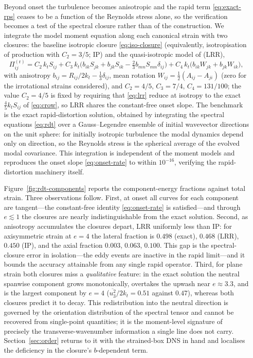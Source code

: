 \documentclass[lineno]{JFM-FLM_Au}
\begin{document}
Beyond onset the turbulence becomes anisotropic and the rapid term
\eqref{eq:exact-rps} ceases to be a function of the Reynolds stress
alone, so the verification becomes a test of the spectral closure rather
than of the construction. We integrate the model moment equation along
each canonical strain with two closures: the baseline isotropic closure
\eqref{eq:iso-closure} (equivalently, isotropisation of production with
$C_2=3/5$; IP) and the quasi-isotropic model of
\citet{LaunderReeceRodi1975} (LRR),
\begin{equation}
  \Pi^{(\mathrm r)}_{ij} = C_2\,k_t S_{ij}
  + C_3\,k_t\big(b_{ik}S_{jk}+b_{jk}S_{ik}
  -\tfrac{2}{3}b_{mn}S_{mn}\delta_{ij}\big)
  + C_4\,k_t\big(b_{ik}W_{jk}+b_{jk}W_{ik}\big),
  \label{eq:lrr}
\end{equation}
with anisotropy $b_{ij}=R_{ij}/2k_t-\tfrac13\delta_{ij}$, mean rotation
$W_{ij}=\tfrac12(A_{ij}-A_{ji})$ (zero for the irrotational strains
considered), and $C_2=4/5$, $C_3=7/4$, $C_4=131/100$; the value
$C_2=4/5$ is fixed by requiring that \eqref{eq:lrr} reduce at isotropy to
the exact $\tfrac45k_tS_{ij}$ of \eqref{eq:crow}, so LRR shares the
constant-free onset slope. The benchmark is the exact rapid-distortion
solution, obtained by integrating the spectral equations \eqref{eq:rdt}
over a Gauss--Legendre ensemble of initial wavevector directions on the
unit sphere: for initially isotropic turbulence the modal dynamics depend
only on direction, so the Reynolds stress is the spherical average of the
evolved modal covariance. This integration is independent of the moment
models and reproduces the onset slope \eqref{eq:onset-rate} to within
$10^{-16}$, verifying the rapid-distortion machinery itself.

Figure~\ref{fig:rdt-components} reports the component-energy fractions
against total strain. Three observations follow. First, at onset all
curves for each component are tangent---the constant-free identity
\eqref{eq:onset-rate} is satisfied---and through $e\lesssim1$ the
closures are nearly indistinguishable from the exact solution. Second,
as anisotropy accumulates the closures depart, LRR uniformly less than
IP: for axisymmetric strain at $e=4$ the lateral fraction is $0.498$
(exact), $0.468$ (LRR), $0.450$ (IP), and the axial fraction $0.003$,
$0.063$, $0.100$. This gap is the spectral-closure error in
isolation---the eddy events are inactive in the rapid limit---and it
bounds the accuracy attainable from any single rapid operator. Third, for plane strain both closures miss
a \emph{qualitative} feature: in the exact solution the neutral spanwise
component grows monotonically, overtakes the upwash near $e\approx3.3$,
and is the largest component by $e=4$
($\overline{u_3^2}/2k_t=0.51$ against $0.47$), whereas both closures
predict it to decay. This redistribution into the neutral direction is
governed by the orientation distribution of the spectral tensor and
cannot be recovered from single-point quantities; it is the moment-level
signature of precisely the transverse-wavenumber information a single
line does not carry. Section~\ref{sec:order} returns to it with the
strained-box DNS in hand and localises the deficiency in the closure's
$b$-dependent term.
\end{document}
